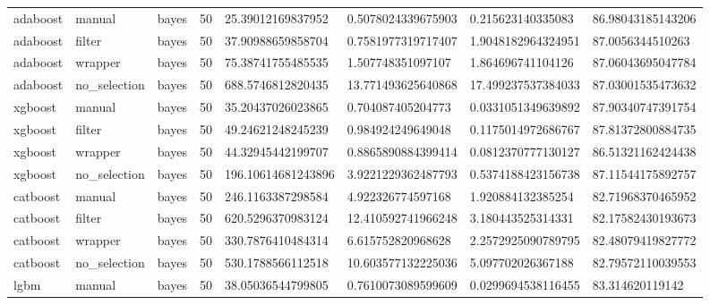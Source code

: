 {\begin{longtable}[c]{@{}llllllll@{}}
	adaboost           & manual        & bayes      & 50  & 25.39012169837952      & 0.5078024339675903     & 0.215623140335083      & 86.98043185143206  \\
	\rowcolor[HTML]{EFEFEF} 
	adaboost           & filter        & bayes      & 50  & 37.90988659858704      & 0.7581977319717407     & 1.9048182964324951     & 87.0056344510263   \\
	adaboost           & wrapper       & bayes      & 50  & 75.38741755485535      & 1.507748351097107      & 1.864696741104126      & 87.06043695047784  \\
	\rowcolor[HTML]{EFEFEF} 
	adaboost           & no\_selection & bayes      & 50  & 688.5746812820435      & 13.771493625640868     & 17.499237537384033     & 87.03001535473632  \\* \midrule
	xgboost            & manual        & bayes      & 50  & 35.20437026023865      & 0.704087405204773      & 0.0331051349639892     & 87.90340747391754  \\
	\rowcolor[HTML]{EFEFEF} 
	xgboost            & filter        & bayes      & 50  & 49.24621248245239      & 0.984924249649048      & 0.1175014972686767     & 87.81372800884735  \\
	xgboost            & wrapper       & bayes      & 50  & 44.32945442199707      & 0.8865890884399414     & 0.0812370777130127     & 86.51321162424438  \\
	\rowcolor[HTML]{EFEFEF} 
	xgboost            & no\_selection & bayes      & 50  & 196.10614681243896     & 3.9221229362487793     & 0.5374188423156738     & 87.11544175892757  \\* \midrule
	catboost           & manual        & bayes      & 50  & 246.1163387298584      & 4.922326774597168      & 1.920884132385254      & 82.71968370465952  \\
	\rowcolor[HTML]{EFEFEF} 
	catboost           & filter        & bayes      & 50  & 620.5296370983124      & 12.410592741966248     & 3.180443525314331      & 82.17582430193673  \\
	catboost           & wrapper       & bayes      & 50  & 330.7876410484314      & 6.615752820968628      & 2.2572925090789795     & 82.48079419827772  \\
	\rowcolor[HTML]{EFEFEF} 
	catboost           & no\_selection & bayes      & 50  & 530.1788566112518      & 10.603577132225036     & 5.097702026367188      & 82.79572110039553  \\* \midrule
	lgbm               & manual        & bayes      & 50  & 38.05036544799805      & 0.7610073089599609     & 0.0299694538116455     & 83.314620119142    \\

\end{longtable}}
